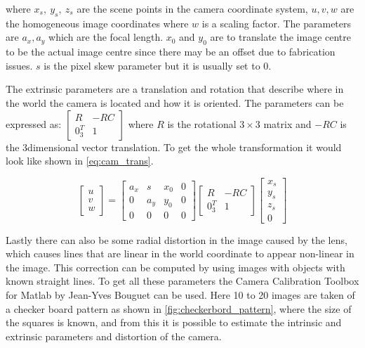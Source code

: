 where $x_s, ~y_s, ~z_s$ are the scene points in the camera coordinate system, $u, v, w$ are the homogeneous image coordinates where $w$ is a scaling factor. The parameters are $a_x, a_y$ which are the focal length. $x_0$ and $y_0$ are to translate the image centre to be the actual image centre since there may be an offset due to fabrication issues.  $s$ is the pixel skew parameter but it is usually set to 0.

The extrinsic parameters are a translation and rotation that describe where in the world the camera is located and how it is oriented. The parameters can be expressed as:
$ \begin{bmatrix}
R & -RC  \\
0_{3}^{T} & 1 
\end{bmatrix}  $
where $R$ is the rotational $3\times 3$ matrix and $-RC$ is the $3$dimensional vector translation. To get the whole transformation it would look like shown in \autoref{eq:cam_trans}.

\begin{equation}\label{eq:cam_trans}
\begin{bmatrix}
u \\
v \\
w 
\end{bmatrix} 
 =
\begin{bmatrix}
a_x & s & x_0 & 0 \\
0 & a_y & y_0 & 0 \\
0 & 0 & 0 & 0 
\end{bmatrix}  
\begin{bmatrix}
R & -RC  \\
0_{3}^{T} & 1 
\end{bmatrix}
\begin{bmatrix}
x_s \\
y_s \\
z_s \\
0 
\end{bmatrix}
\end{equation}

Lastly there can also be some radial distortion in the image caused by the lens, which causes lines that are linear in the world coordinate to appear non-linear in the image. This correction can be computed by using images with objects with known straight lines. To get all these parameters the Camera Calibration Toolbox for Matlab by Jean-Yves Bouguet can be used.  Here 10 to 20 images are taken of a checker board pattern as shown in \autoref{fig:checkerbord_pattern}, where the size of the squares is known, and from this it is possible to estimate the intrinsic and extrinsic parameters and distortion of the camera.

